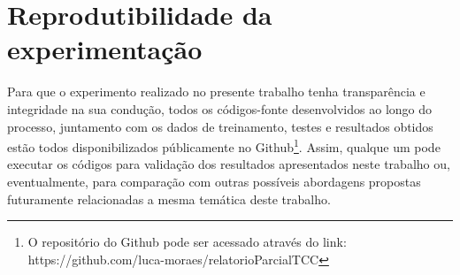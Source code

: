\section{Reprodutibilidade da experimentação}

Para que o experimento realizado no presente trabalho tenha transparência e integridade na sua condução, todos os códigos-fonte desenvolvidos ao longo do processo, juntamento com os dados de treinamento, testes e resultados obtidos estão todos disponibilizados públicamente no Github\footnote[1]{O repositório do Github pode ser acessado através do link: https://github.com/luca-moraes/relatorioParcialTCC}. Assim, qualque um pode executar os códigos para validação dos resultados apresentados neste trabalho ou, eventualmente, para comparação com outras possíveis abordagens propostas futuramente relacionadas a mesma temática deste trabalho.

\newpage